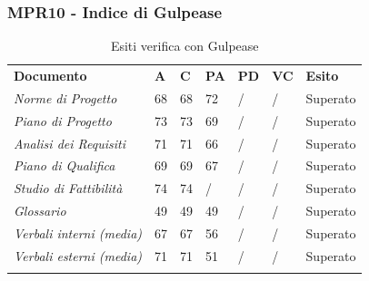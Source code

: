 \subsubsection{MPR10 - Indice di Gulpease}
\begin{center}
    \centering
    \renewcommand{\arraystretch}{1.8}
    \label{tab:IndiciGulpease}
    \begin{longtable}[!h]{p{100px} p{50px} p{50px} p{50px} p{50px} p{50px} p{50px}}
        \caption{Esiti verifica con Gulpease}                                                                                        \\
        \rowcolor{logo!70}   \textbf{Documento} & \textbf{A} & \textbf{C} & \textbf{PA} & \textbf{PD} & \textbf{VC} & \textbf{Esito} \\
        \textit{Norme di Progetto}              & 68         & 68         & 72          & /           & /           & Superato       \\
        \textit{Piano di Progetto}              & 73         & 73         & 69           & /           & /           & Superato       \\
        \textit{Analisi dei Requisiti}          & 71         & 71         & 66          & /           & /           & Superato       \\
        \textit{Piano di Qualifica}             & 69         & 69         & 67           & /           & /           & Superato       \\
        \textit{Studio di Fattibilità}          & 74         & 74         & /           & /           & /           & Superato       \\
        \textit{Glossario}                      & 49         & 49         & 49           & /           & /           & Superato       \\
        \textit{Verbali interni (media)}        & 67         & 67         & 56           & /           & /           & Superato       \\
        \textit{Verbali esterni (media)}        & 71         & 71         & 51           & /           & /           & Superato       \\
        \rowcolor{white}
    \end{longtable}
\end{center}
